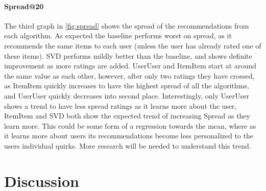 \documentclass[letterpaper]{sig-alternate}
\begin{document}
  \paragraph{Spread@20}
  The third graph in \ref{fig:spread} shows the spread of the recommendations from each algorithm.
  As expected the baseline performs worst on spread, as it recommends the same items to each user (unless the user has already rated one of these items).
  SVD performs mildly better than the baseline, and shows definite improvement as more ratings are added.
  UserUser and ItemItem start at around the same value as each other, however, after only two ratings they have crossed, as ItemItem quickly increases to have the highest spread of all the algorithms, and UserUser quickly decreases into second place.
  Interestingly, only UserUser shows a trend to have less spread ratings as it learns more about the user, ItemItem and SVD both show the expected trend of increasing Spread as they learn more.
  This could be some form of a regression towards the mean, where as it learns more about users its recommendations become less personalized to the users individual quirks.
  More research will be needed to understand this trend.
  

\section{Discussion}

    
\end{document}
